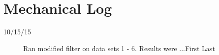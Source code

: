 \section{Mechanical Log}

\begin{description}
\item [10/15/15]  Ran modified filter on data sets 1 - 6.  Results were ...\hfill{First Last}
\end{description}